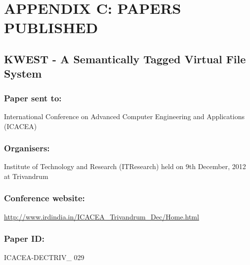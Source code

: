 \chapter*{APPENDIX C: PAPERS PUBLISHED}

\section{KWEST - A Semantically Tagged Virtual File System}
\subsection{Paper sent to:} International Conference on Advanced Computer Engineering and Applications (ICACEA)
\subsection{Organisers:} Institute of Technology and Research (ITResearch) held on 9th December, 2012 at Trivandrum
\subsection{Conference website:} \url{http://www.irdindia.in/ICACEA_Trivandrum_Dec/Home.html}
\hspace*{-1.5cm}
\subsection{Paper ID:} ICACEA-DECTRIV\_ 029
